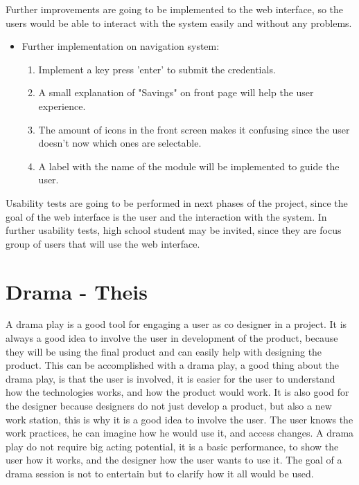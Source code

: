 Further improvements are going to be implemented to the web interface, so the users would be able to interact with the system easily and without any problems. \\
\begin{itemize}
	\item Further implementation on navigation system:
		\begin{enumerate}
			\item Implement a key press 'enter' to submit the credentials.
			\item A small explanation of "Savings" on front page will help the user experience.
			\item The amount of icons in the front screen makes it confusing since the user doesn't now which ones are selectable.
			\item  A label with the name of the module will be implemented to guide the user.
		\end{enumerate}
\end{itemize}

Usability tests are going to be performed in next phases of the project, since the goal of the web interface is the user and the interaction with the system. In further usability tests, high school student may be invited, since they are focus group of users that will use the web interface.\p

\section{Drama - Theis}
A drama play is a good tool for engaging a user as co designer in a project. It is always a good idea to involve the user in development of the product, because they will be using the final product and can easily help with designing the product. This can be accomplished with a drama play, a good thing about the drama play, is that the user is involved, it is easier for the user to understand how the technologies works, and how the product would work. It is also good for the designer because designers do not just develop a product, but also a new work station, this is why it is a good idea to involve the user. The user knows the work practices, he can imagine how he would use it, and access changes. A drama play do not require big acting potential, it is a basic performance, to show the user how it works, and the designer how the user wants to use it. The goal of a drama session is not to entertain but to clarify how it all would be used.

